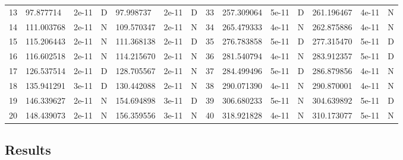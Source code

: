 \documentclass[pdflatex,sn-mathphys-num]{sn-jnl}
\theoremstyle{thmstyleone}%
\theoremstyle{thmstylethree}%
\begin{document}
\begin{table}[t]
\begin{tabular}{@{}rllllll|rllllll@{}}
13 & 97.877714 & 2e-11 & D & 97.998737 & 2e-11 & D & 33 & 257.309064 & 5e-11 & D & 261.196467 & 4e-11 & N\\
14 & 111.003768 & 2e-11 & N & 109.570347 & 2e-11 & N & 34 & 265.479333 & 4e-11 & N & 262.875886 & 4e-11 & N\\
15 & 115.206443 & 2e-11 & N & 111.368138 & 2e-11 & D & 35 & 276.783858 & 5e-11 & D & 277.315470 & 5e-11 & D\\
16 & 116.602518 & 2e-11 & N & 114.215670 & 2e-11 & N & 36 & 281.540794 & 4e-11 & N & 283.912357 & 5e-11 & D\\
17 & 126.537514 & 2e-11 & D & 128.705567 & 2e-11 & N & 37 & 284.499496 & 5e-11 & D & 286.879856 & 4e-11 & N\\
18 & 135.941291 & 3e-11 & D & 130.442088 & 2e-11 & N & 38 & 290.071390 & 4e-11 & N & 290.870001 & 4e-11 & N\\
19 & 146.339627 & 2e-11 & N & 154.694898 & 3e-11 & D & 39 & 306.680233 & 5e-11 & N & 304.639892 & 5e-11 & D\\
20 & 148.439073 & 2e-11 & N & 156.359556 & 3e-11 & N & 40 & 318.921828 & 4e-11 & N & 310.173077 & 5e-11 & N\\
\bottomrule
\end{tabular}
\end{table}

\subsection{Results}
\end{document}
